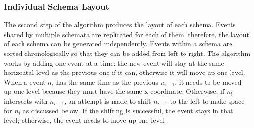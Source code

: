 %
%	

\subsubsection{Individual Schema Layout}
\label{sub:layout-schema}
The second step of the algorithm produces the layout of each schema. Events shared by multiple schemata are replicated for each of them; therefore, the layout of each schema can be generated independently. Events within a schema are sorted chronologically so that they can be added from left to right. The algorithm works by adding one event at a time: the new event will stay at the same horizontal level as the previous one if it can, otherwise it will move up one level. When a event $n_i$ has the same time as the previous $n_{i-1}$, it needs to be moved up one level because they must have the same x-coordinate. Otherwise, if $n_i$ intersects with $n_{i-1}$, an attempt is made to shift $n_{i-1}$ to the left to make space for $n_i$ as discussed below. If the shifting is successful, the event stays in that level; otherwise, the event needs to move up one level.


